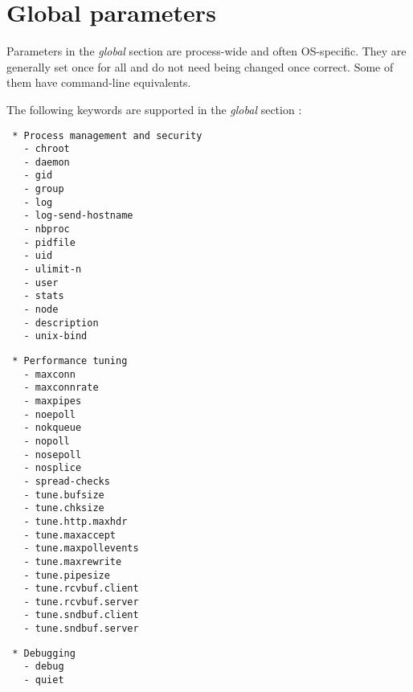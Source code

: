 
\chapter{Global parameters}

Parameters in the \emph{global} section are process-wide and often OS-specific. They
are generally set once for all and do not need being changed once correct. Some
of them have command-line equivalents.


The following keywords are supported in the \emph{global} section :

\begin{verbatim}
 * Process management and security
   - chroot
   - daemon
   - gid
   - group
   - log
   - log-send-hostname
   - nbproc
   - pidfile
   - uid
   - ulimit-n
   - user
   - stats
   - node
   - description
   - unix-bind
\end{verbatim}

\begin{verbatim}
 * Performance tuning
   - maxconn
   - maxconnrate
   - maxpipes
   - noepoll
   - nokqueue
   - nopoll
   - nosepoll
   - nosplice
   - spread-checks
   - tune.bufsize
   - tune.chksize
   - tune.http.maxhdr
   - tune.maxaccept
   - tune.maxpollevents
   - tune.maxrewrite
   - tune.pipesize
   - tune.rcvbuf.client
   - tune.rcvbuf.server
   - tune.sndbuf.client
   - tune.sndbuf.server
\end{verbatim}

\begin{verbatim}
 * Debugging
   - debug
   - quiet
\end{verbatim}


